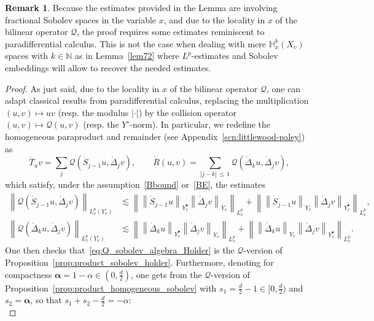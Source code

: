\documentclass[10pt]{amsart}
\theoremstyle{definition}\newtheorem{defi}[theo]{Definition}\newtheorem{rema}[theo]{Remark}\newtheorem{exam}[theo]{Example}\newtheorem{exem}[theo]{Example}\newtheorem{nota}[theo]{Notation}
\newcommand{\N}{\mathbb{N}}
\newcommand{\bbH}{\mathbb{H}}
\newcommand{\QQ}{\mathcal{Q}}
\newcommand{\Sg}{Y}
\newcommand{\Sgp}{Y^{\bullet}}
\newcommand{\Sgm}{Y^{\circ}}
\renewcommand*\le{\leqslant}
\begin{document}
\begin{rema}
Because the estimates provided in the Lemma are involving fractional Sobolev spaces in the variable $x$, and due to the locality in $x$ of the bilinear operator $\QQ$, the proof requires some estimates reminiscent to paradifferential calculus. This is not the case when dealing with mere $\bbH^{k}_{x}(X_{v})$ spaces with $k \in \N$ as in Lemma~\ref{lem72} where $L^{p}$-estimates and Sobolev embeddings will allow to recover the needed estimates.
\end{rema}

\begin{proof}
As just said, due to the locality in $x$ of the bilinear operator $\QQ$, one can adapt classical results from paradifferential calculus, replacing the multiplication $(u, v) \mapsto uv$ (resp. the modulus $|\cdot|$) by the collision operator $(u, v) \mapsto \QQ(u, v)$ (resp. the $\Sgm$-norm). In particular, we redefine the homogeneous paraproduct and remainder (see Appendix~\ref{scn:littlewood-paley}) as
\[
\dot{T}_u v= \sum_{j} \QQ\left(\dot{S}_{j-1} u, \dot{\Delta}_j v \right), \qquad \dot{R}(u, v) = \sum_{|j - k|\,\le\,1} \QQ\left(\dot{\Delta}_k u, \dot{\Delta}_j v \right),
\]
which satisfy, under the assumption~\eqref{Bbound} or~\eqref{BE}, the estimates
\begin{align*}
\left\| \QQ\left(\dot{S}_{j-1} u, \dot{\Delta}_j v \right) \right\|_{ L^p_x \left(\Sgm_v \right) } &\lesssim
\left\| \left\| \dot{S}_{j-1} u \right\|_{ \Sgp_v } \left\| \dot{\Delta}_j v \right\|_{ \Sg_v } \right\|_{ L^p_x } +
\left\| \left\| \dot{S}_{j-1} u \right\|_{ \Sg_v } \left\| \dot{\Delta}_j v \right\|_{ \Sgp_v } \right\|_{ L^p_x },
\\
\left\| \QQ\left(\dot{\Delta}_k u, \dot{\Delta}_j v \right) \right\|_{ L^p_x \left(\Sgm_v \right) } &\lesssim
\left\| \left\| \dot{\Delta}_k u \right\|_{ \Sgp_v } \left\| \dot{\Delta}_j v \right\|_{ \Sg_v } \right\|_{ L^p_x } +
\left\| \left\| \dot{\Delta}_k u \right\|_{ \Sg_v } \left\| \dot{\Delta}_j v \right\|_{ \Sgp_v } \right\|_{ L^p_x }.
\end{align*}
One then checks that~\eqref{eq:Q_sobolev_algebra_Holder} is the $\QQ$-version of Proposition~\ref{prop:product_sobolev_holder}. Furthermore, denoting for compactness $\boldsymbol{\alpha} = 1-\alpha \in (0, \frac{d}{2})$, one gets from the $\QQ$-version of Proposition~\ref{prop:product_homogeneous_sobolev} with $s_1 = \frac{d}{2} -1 \in [0, \frac{d}{2})$ and $s_2 = \boldsymbol{\alpha}$, so that $s_1 + s_2 - \frac{d}{2} = - \alpha$:
\begin{equation*}

\end{equation*}
\end{proof}
\end{document}
